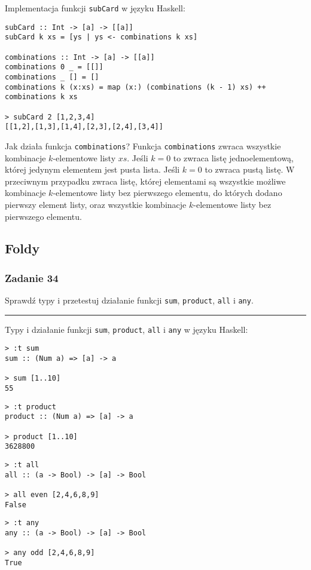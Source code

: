 \documentclass[11pt,a4paper]{article}
\begin{document}
Implementacja funkcji \texttt{subCard} w języku Haskell:
\begin{Verbatim}[frame=single]
subCard :: Int -> [a] -> [[a]]
subCard k xs = [ys | ys <- combinations k xs]

combinations :: Int -> [a] -> [[a]]
combinations 0 _ = [[]]
combinations _ [] = []
combinations k (x:xs) = map (x:) (combinations (k - 1) xs) ++ combinations k xs

> subCard 2 [1,2,3,4]
[[1,2],[1,3],[1,4],[2,3],[2,4],[3,4]]
\end{Verbatim}
Jak działa funkcja \texttt{combinations}? Funkcja \texttt{combinations} zwraca wszystkie kombinacje \(k\)-elementowe listy \(xs\). Jeśli \(k = 0\) to zwraca listę jednoelementową, której jedynym elementem jest pusta lista. Jeśli \(k = 0\) to zwraca pustą listę. W przeciwnym przypadku zwraca listę, której elementami są wszystkie możliwe kombinacje \(k\)-elementowe listy bez pierwszego elementu, do których dodano pierwszy element listy, oraz wszystkie kombinacje \(k\)-elementowe listy bez pierwszego elementu.

\subsection{Foldy}
\subsubsection{Zadanie 34}
Sprawdź typy i przetestuj działanie funkcji \texttt{sum}, \texttt{product}, \texttt{all} i \texttt{any}.

\bigskip
\hrule
\bigskip

Typy i działanie funkcji \texttt{sum}, \texttt{product}, \texttt{all} i \texttt{any} w języku Haskell:
\begin{Verbatim}[frame=single]
> :t sum
sum :: (Num a) => [a] -> a

> sum [1..10]
55
\end{Verbatim}
\begin{Verbatim}[frame=single]
> :t product
product :: (Num a) => [a] -> a

> product [1..10]
3628800
\end{Verbatim}
\begin{Verbatim}[frame=single]
> :t all
all :: (a -> Bool) -> [a] -> Bool

> all even [2,4,6,8,9]
False
\end{Verbatim}
\begin{Verbatim}[frame=single]
> :t any
any :: (a -> Bool) -> [a] -> Bool

> any odd [2,4,6,8,9]
True
\end{Verbatim}
\end{document}
